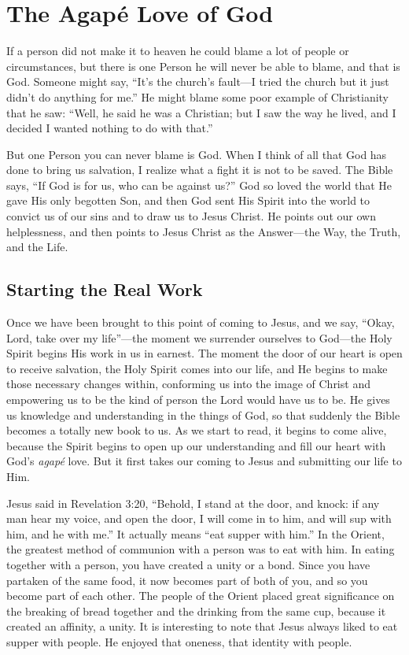 \chapter{The Agapé Love of God}

If a person did not make it to heaven he could blame 
a lot of people or circumstances, but there is one Person 
he will never be able to blame, and that is God. Someone 
might say, “It’s the church’s fault—I tried the church but 
it just didn’t do anything for me.” He might blame some 
poor example of Christianity that he saw: “Well, he said he 
was a Christian; but I saw the way he lived, and I decided I 
wanted nothing to do with that.”

But one Person you can never blame is God. When I 
think of all that God has done to bring us salvation, I realize what a fight it is not to be saved. The Bible says, “If 
God is for us, who can be against us?” God so loved the 
world that He gave His only begotten Son, and then God 
sent His Spirit into the world to convict us of our sins and 
to draw us to Jesus Christ. He points out our own helplessness, and then points to Jesus Christ as the Answer—the 
Way, the Truth, and the Life.


\section*{Starting the Real Work}

Once we have been brought to this point of coming to 
Jesus, and we say, “Okay, Lord, take over my life”—the 
moment we surrender ourselves to God—the Holy Spirit 
begins His work in us in earnest. The moment the door 
of our heart is open to receive salvation, the Holy Spirit 
comes into our life, and He begins to make those necessary 
changes within, conforming us into the image of Christ and 
empowering us to be the kind of person the Lord would
have us to be. He gives us knowledge and understanding 
in the things of God, so that suddenly the Bible becomes a 
totally new book to us. As we start to read, it begins to come 
alive, because the Spirit begins to open up our understanding
 and fill our heart with God’s \emph{agapé} love. But it first takes 
our coming to Jesus and submitting our life to Him.

Jesus said in Revelation 3:20, “Behold, I stand at the 
door, and knock: if any man hear my voice, and open the 
door, I will come in to him, and will sup with him, and he 
with me.” It actually means “eat supper with him.” In the 
Orient, the greatest method of communion with a person 
was to eat with him. In eating together with a person, you 
have created a unity or a bond. Since you have partaken 
of the same food, it now becomes part of both of you, and 
so you become part of each other. The people of the Orient 
placed great significance on the breaking of bread together 
and the drinking from the same cup, because it created an 
affinity, a unity. It is interesting to note that Jesus always 
liked to eat supper with people. He enjoyed that oneness, 
that identity with people.

